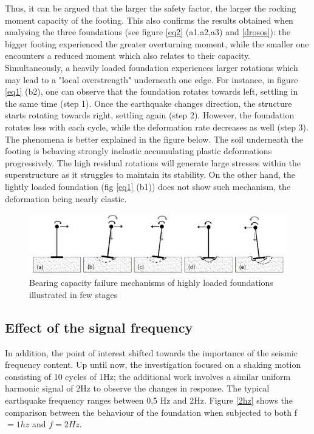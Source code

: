  Thus, it can be argued that the larger the safety factor, the larger the rocking moment capacity of the footing. This also confirms the results obtained when analysing the three foundations (see figure \ref{eq2} (a1,a2,a3) and \ref{drosos}): the bigger footing experienced the greater overturning moment, while the smaller one encounters a reduced moment which also relates to their capacity. Simultaneously, a heavily loaded foundation experiences larger rotations which may lead to a "local overstrength" underneath one edge. For instance, in figure \ref{eq1} (b2), one can observe that the foundation rotates towards left, settling in the same time (step 1). Once the earthquake changes direction, the structure starts rotating towards right, settling again (step 2). However, the foundation rotates less with each cycle, while the deformation rate decreases as well (step 3). The phenomena is better explained in the figure below. The soil underneath the footing is behaving strongly inelastic accumulating plastic deformations progressively. The high residual rotations will generate large stresses within the superstructure as it struggles to maintain its stability. On the other hand, the lightly loaded foundation (fig \ref{eq1} (b1)) does not show such mechanism, the deformation being nearly elastic. 
 
  \begin{figure}[!h]
  	\centering
  	\includegraphics[width=0.7 \linewidth]{"bearing"}
  	\caption{Bearing capacity failure mechanisms of highly loaded foundations illustrated in few stages}
  	\label{bearingc}
  \end{figure}
 
 \pagebreak
 
 \newpage
 \subsection{Effect of the signal frequency}
 In addition, the point of interest shifted towards the importance of the seismic frequency content. Up until now, the investigation focused on a shaking motion consisting of 10 cycles of 1Hz; the additional work involves a similar uniform harmonic signal of 2Hz to observe the changes in response. The typical earthquake frequency ranges between 0,5 Hz and 2Hz. Figure \ref{2hz} shows the comparison between the behaviour of the foundation when subjected to both \gls{f}$=1hz$ and $f=2Hz$.
 

